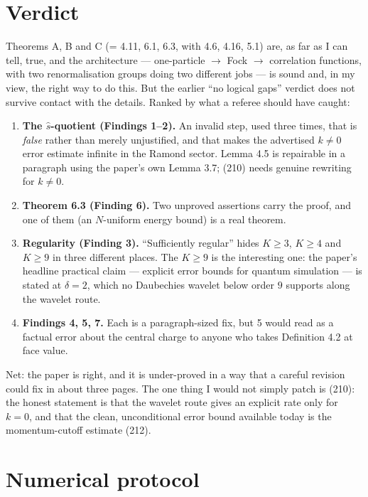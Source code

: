 \documentclass[11pt,a4paper]{article}
\theoremstyle{definition}
\newcommand{\sh}{\hat{s}}
\begin{document}
\section*{Verdict}

\noindent
Theorems A, B and C (= 4.11, 6.1, 6.3, with 4.6, 4.16, 5.1) are, as far as I can tell, true, and
the architecture --- one-particle $\to$ Fock $\to$ correlation functions, with two
renormalisation groups doing two different jobs --- is sound and, in my view, the right way to
do this. But the earlier ``no logical gaps'' verdict does not survive contact with the details.
Ranked by what a referee should have caught:

\begin{enumerate}[leftmargin=1.7em,itemsep=2pt]
\item \textbf{The $\sh$-quotient (Findings 1--2).} An invalid step, used three times, that is
\emph{false} rather than merely unjustified, and that makes the advertised $k\neq0$ error
estimate infinite in the Ramond sector. Lemma 4.5 is repairable in a paragraph using the
paper's own Lemma 3.7; (210) needs genuine rewriting for $k\neq0$.
\item \textbf{Theorem 6.3 (Finding 6).} Two unproved assertions carry the proof, and one of them
(an $N$-uniform energy bound) is a real theorem.
\item \textbf{Regularity (Finding 3).} ``Sufficiently regular'' hides $K\ge3$, $K\ge4$ and
$K\ge9$ in three different places. The $K\ge9$ is the interesting one: the paper's headline
practical claim --- explicit error bounds for quantum simulation --- is stated at $\delta=2$,
which no Daubechies wavelet below order $9$ supports along the wavelet route.
\item \textbf{Findings 4, 5, 7.} Each is a paragraph-sized fix, but 5 would read as a factual
error about the central charge to anyone who takes Definition 4.2 at face value.
\end{enumerate}

\noindent
Net: the paper is right, and it is under-proved in a way that a careful revision could fix in
about three pages. The one thing I would not simply patch is (210): the honest statement is
that the wavelet route gives an explicit rate only for $k=0$, and that the clean, unconditional
error bound available today is the momentum-cutoff estimate (212).

\appendix
\section{Numerical protocol}
\end{document}
